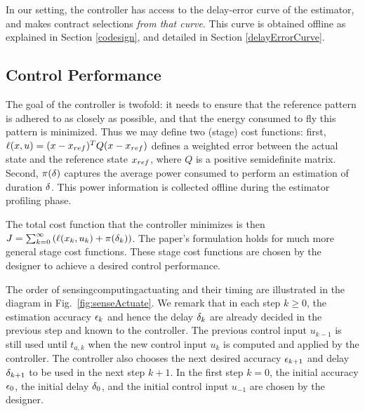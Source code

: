 In our setting, the controller has access to the delay-error curve of the estimator, and makes contract selections \emph{from that curve}. 
This curve is obtained offline as explained in Section \ref{codesign}, and detailed in Section \ref{delayErrorCurve}.

\subsection{Control Performance}
The goal of the controller is twofold: it needs to ensure that the reference pattern is adhered to as closely as possible, and that the energy consumed to fly this pattern is minimized.
Thus we may define two (stage) cost functions: first, $\ell(x, u) = (x - x_{ref})^TQ(x - x_{ref})$ defines a weighted error between the actual state and the reference state $x_{ref}$, where $Q$ is a positive semidefinite matrix.
Second, $\pi(\delta)$ captures the average power consumed to perform an estimation of duration $\delta$. 
This power information is collected offline during the estimator profiling phase.

The total cost function that the controller minimizes is then
\(
J=\sum_{k=0}^{\infty}\left(\ell(x_k,u_k)+\pi(\delta_k)\right)
\).
The paper's formulation holds for much more general stage cost functions.
These stage cost functions are chosen by the designer to achieve a desired control performance.

The order of sensing\textendash{}computing\textendash{}actuating and
their timing are illustrated in the diagram in Fig.~\ref{fig:senseActuate}.
We remark that in each step $k\geq0$, the estimation accuracy $\epsilon_k$
and hence the delay $\delta_k$ are already decided in the previous
step and known to the controller. 
The previous control input $u_{k-1}$
is still used until $t_{a,k}$ when the new control input $u_{k}$
is computed and applied by the controller. 
The controller also chooses
the next desired accuracy $\epsilon_{k+1}$ and delay $\delta_{k+1}$
to be used in the next step $k+1$. 
In the first step $k=0$, the
initial accuracy $\epsilon_0$, the initial delay $\delta_0$, and
the initial control input $u_{-1}$ are chosen by the designer.

